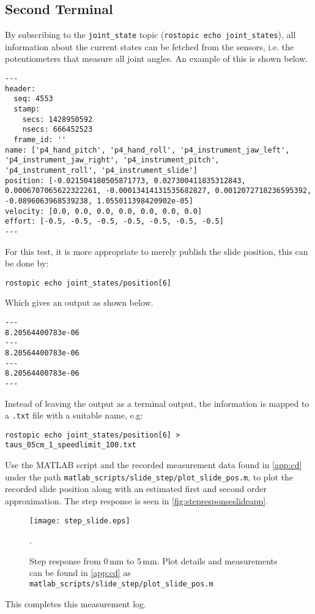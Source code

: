 \subsection*{Second Terminal}
By subscribing to the \texttt{joint\_state} topic (\texttt{rostopic echo joint\_states}), all information about the current states can be fetched from the sensors, i.e. the potentiometers that measure all joint angles. An example of this is shown below.
\begin{lstlisting}[style=DOS]
---
header: 
  seq: 4553
  stamp: 
    secs: 1428950592
    nsecs: 666452523
  frame_id: ''
name: ['p4_hand_pitch', 'p4_hand_roll', 'p4_instrument_jaw_left', 'p4_instrument_jaw_right', 'p4_instrument_pitch', 'p4_instrument_roll', 'p4_instrument_slide']
position: [-0.021504180505871773, 0.027300411835312843, 0.0006707065622322261, -0.00013414131535682827, 0.0012072718236595392, -0.0896063968539238, 1.055011398420902e-05]
velocity: [0.0, 0.0, 0.0, 0.0, 0.0, 0.0, 0.0]
effort: [-0.5, -0.5, -0.5, -0.5, -0.5, -0.5, -0.5]
---
\end{lstlisting}

For this test, it is more appropriate to merely publish the slide position, this can be done by:

\hspace{1cm}\texttt{rostopic echo joint\_states/position[6]}

Which gives an output as shown below.

\begin{lstlisting}[style=DOS]
---
8.20564400783e-06
---
8.20564400783e-06
---
8.20564400783e-06
---
\end{lstlisting}
Instead of leaving the output as a terminal output, the information is mapped to a \texttt{.txt} file with a suitable name, e.g:

\hspace{1cm} \texttt{rostopic echo joint\_states/position[6] > taus\_05cm\_1\_speedlimit\_100.txt}

Use the MATLAB script and the recorded measurement data found in \autoref{app:cd} under the path \texttt{matlab\_scripts/slide\_step/plot\_slide\_pos.m}, to plot the recorded slide position along with an estimated first and second order approximation. The step response is seen in \autoref{fig:stepresponseslideapp}.
\begin{figure}[H]
\center
\texttt{[image: step\_slide.eps]}
\caption{Step response from 0\,mm to 5\,mm. Plot details and measurements can be found in \autoref{app:cd} as \texttt{matlab\_scripts/slide\_step/plot\_slide\_pos.m}}. 
\label{fig:stepresponseslideapp}
\end{figure}
This completes this measurement log.